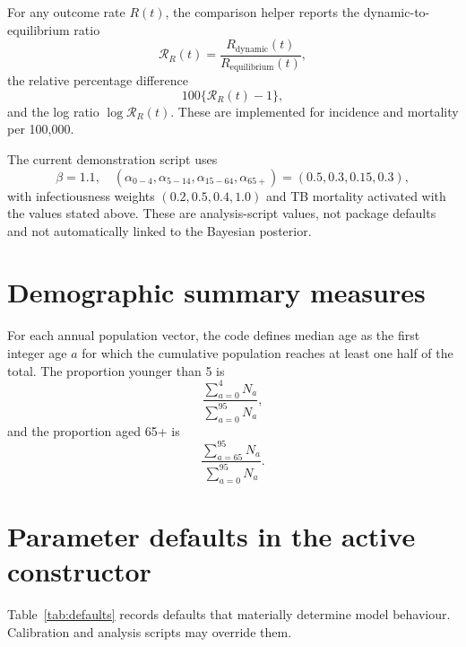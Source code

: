 \documentclass[11pt]{article}
\begin{document}
For any outcome rate $R(t)$, the comparison helper reports the dynamic-to-equilibrium ratio
\begin{equation}
\mathcal R_R(t)=\frac{R_{\mathrm{dynamic}}(t)}{R_{\mathrm{equilibrium}}(t)},
\end{equation}
the relative percentage difference
\begin{equation}
100\{\mathcal R_R(t)-1\},
\end{equation}
and the log ratio $\log\mathcal R_R(t)$. These are implemented for incidence and mortality per 100,000.

The current demonstration script uses
\[
\beta=1.1,\quad
(\alpha_{0-4},\alpha_{5-14},\alpha_{15-64},\alpha_{65+})=(0.5,0.3,0.15,0.3),
\]
with infectiousness weights $(0.2,0.5,0.4,1.0)$ and TB mortality activated with the values stated above. These are analysis-script values, not package defaults and not automatically linked to the Bayesian posterior.

\section{Demographic summary measures}

For each annual population vector, the code defines median age as the first integer age $a$ for which the cumulative population reaches at least one half of the total. The proportion younger than 5 is
\begin{equation}
\frac{\sum_{a=0}^{4}N_a}{\sum_{a=0}^{95}N_a},
\end{equation}
and the proportion aged 65+ is
\begin{equation}
\frac{\sum_{a=65}^{95}N_a}{\sum_{a=0}^{95}N_a}.
\end{equation}

\section{Parameter defaults in the active constructor}

Table~\ref{tab:defaults} records defaults that materially determine model behaviour. Calibration and analysis scripts may override them.
\end{document}

